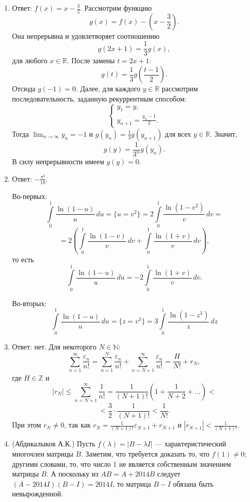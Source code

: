\begin{enumerate}
\item Ответ: $f(x) = x - \frac{3}{2}$. Рассмотрим функцию 
$$g(x) = f(x) - \left(x - \frac{3}{2}\right).$$
Она непрерывна и удовлетворяет соотношению 
$$g(2x+1) = \frac{1}{3} g(x),$$ 
для любого $x \in \mathbb{R}$. После замены $t = 2x+1$:
$$g(t) = \frac{1}{3} g\left( \frac{t-1}{2} \right).$$
Отсюда $g(-1) = 0$. Далее, для каждого $y \in \mathbb{R}$ рассмотрим последовательность, заданную рекуррентным способом: 
$$\begin{cases}
y_1 = y, \\
y_{n+1} = \frac{y_n-1}{2}.
\end{cases}$$
Тогда $\lim_{n \to \infty} {y_n} = -1$ и $g(y_n) = \frac{1}{3} g(y_{n+1})$ для всех $y \in \mathbb{R}$. 
Значит,
$$g(y) = \frac{1}{3^n} g(y_{n}).$$
В силу непрерывности имеем $g(y) = 0$.  

\item Ответ: $-\frac{\pi^2}{18}$.

Во-первых:
$$
\int\limits_{0}^{1} \frac{\ln(1-u)}{u} \,du = 
\{ u = v^2 \} = 
2 \int\limits_{0}^{1} \frac{\ln(1-v^2)}{v} \,dv = $$
$$=2 \left( 
\int\limits_{0}^{1} \frac{\ln(1-v)}{v} \,dv 
+
\int\limits_{0}^{1} \frac{\ln(1+v)}{v} \,dv
\right),
$$
то есть
$$
\int\limits_{0}^{1} \frac{\ln(1-u)}{u} \,du = 
-2 \int\limits_{0}^{1} \frac{\ln(1+v)}{v} \,dv .
$$

Во-вторых:
$$
\int\limits_{0}^{1} \frac{\ln(1-u)}{u} \,du = 
\{ z = v^3 \} = 
3 \int\limits_{0}^{1} \frac{\ln(1-z^3)}{z} \,dz$$


\item Ответ: нет. Для некоторого $N \in \mathbb{N}$:
$$\sum_{n=1}^{\infty} \frac{\varepsilon_n}{n!} =
\sum_{n=1}^{N} \frac{\varepsilon_n}{n!} +
\sum_{n=N+1}^{\infty} \frac{\varepsilon_n}{n!} =
\frac{H}{N!} + r_N,$$
где $H \in \mathbb{Z}$ и 
$$|r_N| \leqslant \sum_{n=N+1}^{\infty} \frac{1}{n!} = \frac{1}{(N+1)!} \left( 1 + \frac{1}{N+2} + ... \right) < $$
$$ < \frac{3}{2} \cdot \frac{1}{(N+1)!} < \frac{1}{N!}.$$
При этом $r_N \neq 0$, так как $r_{N} = \frac{1}{(N+1)!} \varepsilon_{N+1} + r_{N+1}$ и $|r_{N+1}| < \frac{1}{(N+1)!}$.

\item (Абдикалыков А.К.) Пусть $f(\lambda) = |B-\lambda I|$ --- характеристический многочлен матрицы $B$. Заметим, что требуется доказать то, что $f(1)\ne 0$; другими словами, то, что число 1 не является собственным значением матрицы $B$. А поскольку из $AB=A+2014B$ следует $(A-2014I)(B-I)=2014I$, то матрица $B-I$ обязана быть невырожденной.


\end{enumerate}
